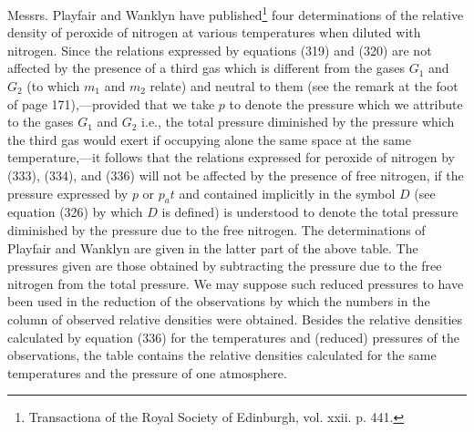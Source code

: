 \documentclass[12pt]{article}
\begin{document}
Messrs. Playfair and Wanklyn have published\footnote{Transactiona of the Royal Society of Edinburgh, vol. xxii. p. 441.} four determinations of the relative density of peroxide of nitrogen at various temperatures when diluted with nitrogen. Since the relations expressed by equations (319) and (320) are not affected by the presence of a third gas which is different from the gases $G_1$  and $G_2$ (to which $m_1$ and $m_2$ relate) and neutral to them (see the remark at the foot of page 171),---provided that we take $p$ to denote the pressure which we attribute to the gases $G_1$ and $G_2$ i.e., the total pressure diminished by the pressure which the third gas would exert if occupying alone the same space at the same temperature,---it follows that the relations expressed for peroxide of nitrogen by (333), (334), and (336) will not be affected by the presence of free nitrogen, if the pressure expressed by $p$ or $p_at$ and contained implicitly in the symbol $D$ (see equation (326) by which $D$ is defined) is understood to denote the total pressure diminished by the pressure due to the free nitrogen. The determinations of Playfair and Wanklyn are given in the latter part of the above table. The pressures given are those obtained by subtracting the pressure due to the free nitrogen from the total pressure. We may suppose such reduced pressures to have been used in the reduction of the observations by which the numbers in the column of observed relative densities were obtained. Besides the relative densities calculated by equation (336) for the temperatures and (reduced) pressures of the observations, the table contains the relative densities calculated for the same temperatures and the pressure of one atmosphere.
\end{document}
